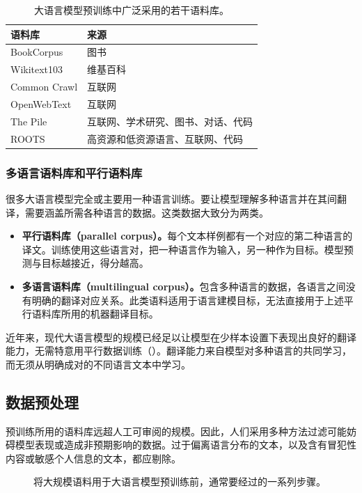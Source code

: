 \begin{table}[!htbp]
\centering
\caption{大语言模型预训练中广泛采用的若干语料库。}
\label{tab:ch02-corpora}
\small
\begin{tabularx}{\linewidth}{@{}lX@{}}
\toprule
语料库 & 来源\\
\midrule
BookCorpus & 图书\\
Wikitext103 & 维基百科\\
Common Crawl & 互联网\\
OpenWebText & 互联网\\
The Pile & 互联网、学术研究、图书、对话、代码\\
ROOTS & 高资源和低资源语言、互联网、代码\\
\bottomrule
\end{tabularx}
\end{table}

\subsubsection{多语言语料库和平行语料库}
很多大语言模型完全或主要用一种语言训练。要让模型理解多种语言并在其间翻译，需要涵盖所需各种语言的数据。这类数据大致分为两类。
\begin{itemize}
\item \textbf{平行语料库（parallel corpus）。}每个文本样例都有一个对应的第二种语言的译文。训练使用这些语言对，把一种语言作为输入，另一种作为目标。模型预测与目标越接近，得分越高。
\item \textbf{多语言语料库（multilingual corpus）。}包含多种语言的数据，各语言之间没有明确的翻译对应关系。此类语料适用于语言建模目标，无法直接用于上述平行语料库所用的机器翻译目标。
\end{itemize}
近年来，现代大语言模型的规模已经足以让模型在少样本设置下表现出良好的翻译能力，无需特意用平行数据训练（）。翻译能力来自模型对多种语言的共同学习，而无须从明确成对的不同语言文本中学习。

\subsection{数据预处理}
预训练所用的语料库远超人工可审阅的规模。因此，人们采用多种方法过滤可能妨碍模型表现或造成非预期影响的数据。过于偏离语言分布的文本，以及含有冒犯性内容或敏感个人信息的文本，都应剔除。

\begin{figure}[!htbp]
\centering

\caption{将大规模语料用于大语言模型预训练前，通常要经过的一系列步骤。}
\label{fig:ch02-cleaning}
\end{figure}

